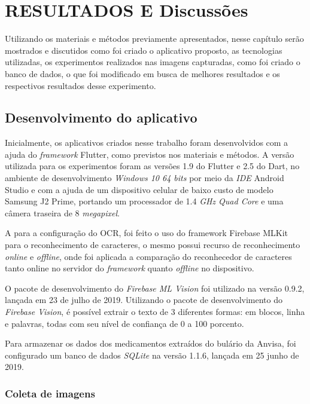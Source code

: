 \chapter{RESULTADOS E Discussões}\label{ch:intro}

Utilizando os materiais e métodos previamente apresentados, nesse capítulo serão mostrados e discutidos como foi criado o aplicativo proposto, as tecnologias utilizadas, os experimentos realizados nas imagens capturadas, como foi criado o banco de dados, o que foi modificado em busca de melhores resultados e os respectivos resultados desse experimento.


\section{Desenvolvimento do aplicativo}
Inicialmente, os aplicativos criados nesse trabalho foram desenvolvidos com a ajuda do \textit{framework} Flutter, como previstos nos materiais e métodos. A versão utilizada para os experimentos foram as versões 1.9 do Flutter e 2.5 do Dart, no ambiente de desenvolvimento \textit{Windows 10 64 bits} por meio da \textit{IDE} Android Studio e com a ajuda de um dispositivo celular de baixo custo de modelo Samsung J2 Prime, portando um processador de 1.4 \textit{GHz Quad Core} e uma câmera traseira de 8 \textit{megapixel}. 

A para a configuração do OCR, foi feito o uso do framework Firebase MLKit para o reconhecimento de caracteres, o mesmo possui recurso de reconhecimento \textit{online} e \textit{offline}, onde foi aplicada a comparação do reconhecedor de caracteres tanto online no servidor do \textit{framework} quanto \textit{offline} no dispositivo.

O pacote de desenvolvimento do \textit{Firebase ML Vision} foi utilizado na versão 0.9.2, lançada em 23 de julho de 2019.	Utilizando o pacote de desenvolvimento do \textit{Firebase Vision}, é possível extrair o texto de 3 diferentes formas: em blocos, linha e palavras, todas com seu nível de confiança de 0 a 100 porcento.
 
 Para armazenar os dados dos medicamentos extraídos do bulário da Anvisa, foi configurado um banco de dados \textit{SQLite} na versão 1.1.6, lançada em 25 junho de 2019.

\subsection{Coleta de imagens}

